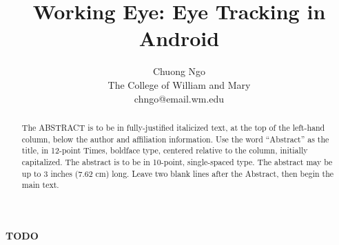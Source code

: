 \documentclass[times, 10pt,twocolumn]{article}
\newcommand{\projname}{Working Eye}
\begin{document}
\title{\projname: Eye Tracking in Android}

\author{Chuong Ngo\\
The College of William and Mary\\
chngo@email.wm.edu
}

\maketitle
\thispagestyle{empty}

\begin{abstract}
   The ABSTRACT is to be in fully-justified italicized text, at the top 
   of the left-hand column, below the author and affiliation 
   information. Use the word ``Abstract'' as the title, in 12-point 
   Times, boldface type, centered relative to the column, initially 
   capitalized. The abstract is to be in 10-point, single-spaced type. 
   The abstract may be up to 3 inches (7.62 cm) long. Leave two blank 
   lines after the Abstract, then begin the main text. 
\end{abstract}


\textbf{TODO} 




\nocite{smyth2010forgotten,
	kleuckerfallback,
	suh2003effect,
	aladwani2001online,
	cheng2006adoption,
	oghenerukeybe2009customers,
	just2009personal
}


\end{document}
